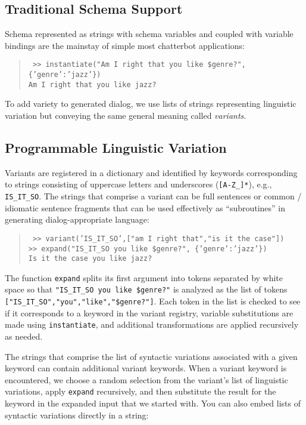 \documentclass[letterpaper,11pt]{article}
\begin{document}
\subsection*{Traditional Schema Support}

Schema represented as strings with schema variables and coupled with variable bindings are the mainstay of simple most chatterbot applications:

\begin{quotation} \tt
%
  \noindent
  >> instantiate("Am I right that you like \$genre?", \{'genre':'jazz'\})\\
  Am I right that you like jazz?\\
%
\end{quotation}
%
To add variety to generated dialog, we use lists of strings representing linguistic variation but conveying the same general meaning called {\it{variants}}.

\subsection*{Programmable Linguistic Variation}

Variants are registered in a dictionary and identified by keywords corresponding to strings consisting of uppercase letters and underscores ({\tt{[A-Z\_]*}}), e.g., {\tt{IS\_IT\_SO}}.
%
The strings that comprise a variant can be full sentences or common / idiomatic sentence fragments that can be used effectively as ``subroutines'' in generating dialog-appropriate language:

\begin{quotation} \tt
%
  \noindent
  >> variant('IS\_IT\_SO',["am I right that","is it the case"])\\
  >> expand("IS\_IT\_SO you like \$genre?", \{'genre':'jazz'\})\\
  Is it the case you like jazz?\\
%
\end{quotation}
%
The function {\tt{expand}} splits its first argument into tokens separated by white space so that {\tt{"IS\_IT\_SO you like \$genre?"}} is analyzed as the list of tokens {\tt{["IS\_IT\_SO","you","like","\$genre?"]}}. Each token in the list is checked to see if it corresponds to a keyword in the variant registry, variable substitutions are made using {\tt{instantiate}}, and additional transformations are applied recursively as needed.

The strings that comprise the list of syntactic variations associated with a given keyword can contain additional variant keywords. When a variant keyword is encountered, we choose a random selection from the variant's list of linguistic variations, apply {\tt{expand}} recursively, and then substitute the result for the keyword in the expanded input that we started with.  You can also embed lists of syntactic variations directly in a string:
\end{document}
